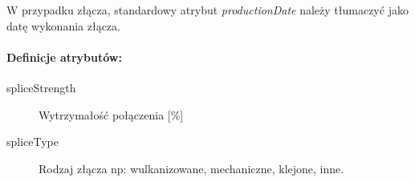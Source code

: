 \documentclass[12pt,a4paper]{article}
\begin{document}
W przypadku złącza, standardowy atrybut \emph{productionDate} należy tłumaczyć
jako datę wykonania złącza.

\paragraph{Definicje atrybutów:}
\begin{description}
\item[spliceStrength] Wytrzymałość połączenia [\%]
\item[spliceType] Rodzaj złącza np: wulkanizowane, mechaniczne, klejone, inne.
\end{description}
\end{document}
